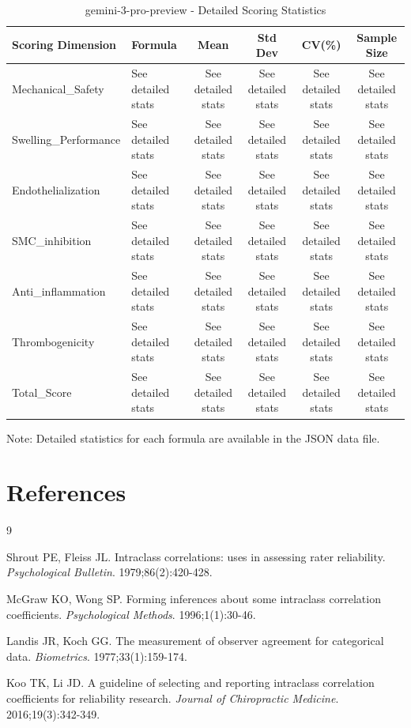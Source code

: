 \documentclass[12pt,a4paper]{article}
\begin{document}
\begin{table}[H]
\centering
\caption{gemini-3-pro-preview - Detailed Scoring Statistics}
\small
\begin{tabular}{llcccc}
\toprule
\textbf{Scoring Dimension} & \textbf{Formula} & \textbf{Mean} & \textbf{Std Dev} & \textbf{CV(\%)} & \textbf{Sample Size} \\
\midrule
Mechanical\_Safety & See detailed stats & See detailed stats & See detailed stats & See detailed stats & See detailed stats \\
Swelling\_Performance & See detailed stats & See detailed stats & See detailed stats & See detailed stats & See detailed stats \\
Endothelialization & See detailed stats & See detailed stats & See detailed stats & See detailed stats & See detailed stats \\
SMC\_inhibition & See detailed stats & See detailed stats & See detailed stats & See detailed stats & See detailed stats \\
Anti\_inflammation & See detailed stats & See detailed stats & See detailed stats & See detailed stats & See detailed stats \\
Thrombogenicity & See detailed stats & See detailed stats & See detailed stats & See detailed stats & See detailed stats \\
Total\_Score & See detailed stats & See detailed stats & See detailed stats & See detailed stats & See detailed stats \\
\bottomrule
\end{tabular}
\end{table}

Note: Detailed statistics for each formula are available in the JSON data file.


\section*{References}

\begin{thebibliography}{9}

Shrout PE, Fleiss JL.
\newblock Intraclass correlations: uses in assessing rater reliability.
\newblock \emph{Psychological Bulletin}. 1979;86(2):420-428.

McGraw KO, Wong SP.
\newblock Forming inferences about some intraclass correlation coefficients.
\newblock \emph{Psychological Methods}. 1996;1(1):30-46.

Landis JR, Koch GG.
\newblock The measurement of observer agreement for categorical data.
\newblock \emph{Biometrics}. 1977;33(1):159-174.

Koo TK, Li JD.
\newblock A guideline of selecting and reporting intraclass correlation coefficients for reliability research.
\newblock \emph{Journal of Chiropractic Medicine}. 2016;19(3):342-349.

\end{thebibliography}

\newpage
\end{document}

